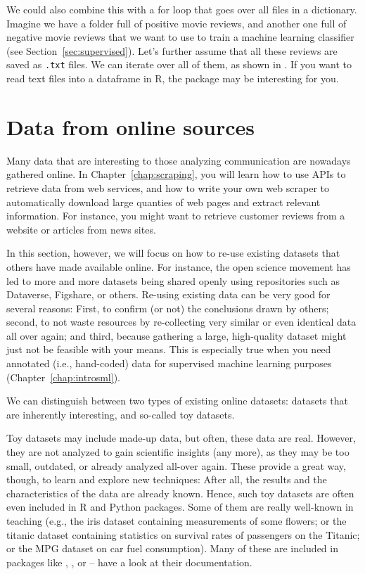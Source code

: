 We could also combine this with a for loop that goes over all files in a dictionary.
Imagine we have a folder full of positive movie reviews, and another one full of negative movie reviews that we want to use to train a machine learning classifier (see Section~\ref{sec:supervised}).
Let's further assume that all these reviews are saved as \texttt{.txt} files.
We can iterate over all of them, as shown in . If you want to read text files into a dataframe in R, the  package may be interesting for you.


\section{Data from online sources}
\label{sec:gathering}

Many data that are interesting to those analyzing communication are
nowadays gathered online.  In Chapter~\ref{chap:scraping}, you will
learn how to use APIs to retrieve data from web services, and how to
write your own web scraper to automatically download large quanties of
web pages and extract relevant information. For instance, you might
want to retrieve customer reviews from a website or articles from news
sites.

In this section, however, we will focus on how to re-use existing
datasets that others have made available online. For instance, the
open science movement has led to more and more datasets being shared
openly using repositories such as Dataverse, Figshare, or
others. Re-using existing data can be very good for several reasons:
First, to confirm (or not) the conclusions drawn by others; second, to
not waste resources by re-collecting very similar or even identical
data all over again; and third, because gathering a large,
high-quality dataset might just not be feasible with your means. This
is especially true when you need annotated (i.e., hand-coded) data for
supervised machine learning purposes (Chapter~\ref{chap:introsml}).

We can distinguish between two types of existing online datasets:
datasets that are inherently interesting, and so-called toy datasets.

Toy datasets may include made-up data, but often, these data are
real. However, they are not analyzed to gain scientific insights (any
more), as they may be too small, outdated, or already analyzed
all-over again. These provide a great way, though, to learn and
explore new techniques: After all, the results and the characteristics
of the data are already known. Hence, such toy datasets are often
even included in R and Python packages. Some of them are really
well-known in teaching (e.g., the iris dataset containing measurements
of some flowers; or the titanic dataset containing statistics on
survival rates of passengers on the Titanic; or the MPG dataset on car fuel consumption). Many of these are included
in packages like , , or -- have a look at their documentation.

